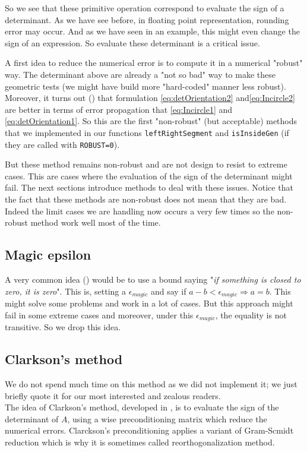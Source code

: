 So we see that these primitive operation correspond to evaluate the sign of a determinant. As we have see before, in floating point representation, rounding error may occur. And as we have seen in an example, this might even change the sign of an expression. So evaluate these determinant is a critical issue.

A first idea to reduce the numerical error is to compute it in a numerical "robust" way. The determinant above are already a "not so bad" way to make these geometric tests (we might have build more "hard-coded" manner less robust). Moreover, it turns out (\cite{shewchuk1996robust}) that formulation \eqref{eq:detOrientation2} and\eqref{eq:Incircle2} are better in terms of error propagation that \eqref{eq:Incircle1} and \eqref{eq:detOrientation1}.
So this are the first "non-robust" (but acceptable) methods that we implemented in our functions \texttt{leftRightSegment} and \texttt{isInsideGen} (if they are called with \texttt{ROBUST=0}).

But these method remains non-robust and are not design to resist to extreme cases. This are cases where the evaluation of the sign of the determinant might fail. The next sections introduce methods to deal with these issues. Notice that the fact that these methods are non-robust does not mean that they are bad. Indeed the limit cases we are handling now occurs a very few times so the non-robust method work well most of the time. 

\subsection{Magic epsilon}
A very common idea (\cite{schirra}) would be to use a bound saying "\textit{if something is closed to zero, it is zero}". This is, setting a $\epsilon _{magic}$ and say if $a-b<\epsilon _{magic} \Rightarrow a=b$. This might solve some problems and work in a lot of cases. But this approach might fail in some extreme cases and moreover, under this $\epsilon_{magic}$, the equality is not transitive. So we drop this idea.
  
\subsection{Clarkson's method}
We do not spend much time on this method as we did not implement it; we just briefly quote it for our most interested and zealous readers.\\
The idea of Clarkson's method, developed in \cite{bronnimann2000efficient}, is to evaluate the sign of the determinant of $A$, using a wise preconditioning matrix which reduce the numerical errors. Clarckson's preconditioning applies a variant of Gram-Scmidt reduction which is why it is sometimes called reorthogonalization method.


